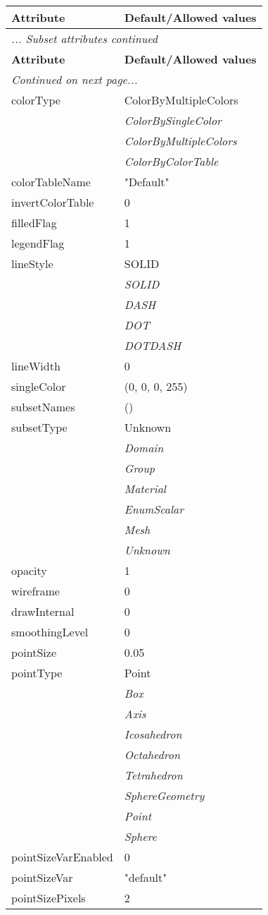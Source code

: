 \documentclass[10pt,a4paper]{report}
\begin{document}
\begin{longtable}{ll}
{\bf Attribute} & {\bf Default/Allowed values} \\
\hline \hline
\endfirsthead
\multicolumn{2}{l}{{\it ... Subset attributes continued}} \\
{\bf Attribute} & {\bf Default/Allowed values} \\
\hline \hline
\endhead
\hline
\multicolumn{2}{l}{{\it Continued on next page...}} \\
\endfoot
\hline
\endlastfoot

colorType  &  ColorByMultipleColors   \\
 & {\it  ColorBySingleColor} \\
 & {\it  ColorByMultipleColors} \\
 & {\it  ColorByColorTable} \\
colorTableName  &  "Default" \\
invertColorTable  &  0 \\
filledFlag  &  1 \\
legendFlag  &  1 \\
lineStyle  &  SOLID   \\
 & {\it  SOLID} \\
 & {\it  DASH} \\
 & {\it  DOT} \\
 & {\it  DOTDASH} \\
lineWidth  &  0 \\
singleColor  &  (0, 0, 0, 255) \\
subsetNames  &  () \\
subsetType  &  Unknown   \\
 & {\it  Domain} \\
 & {\it  Group} \\
 & {\it  Material} \\
 & {\it  EnumScalar} \\
 & {\it  Mesh} \\
 & {\it  Unknown} \\
opacity  &  1 \\
wireframe  &  0 \\
drawInternal  &  0 \\
smoothingLevel  &  0 \\
pointSize  &  0.05 \\
pointType  &  Point   \\
 & {\it  Box} \\
 & {\it  Axis} \\
 & {\it  Icosahedron} \\
 & {\it  Octahedron} \\
 & {\it  Tetrahedron} \\
 & {\it  SphereGeometry} \\
 & {\it  Point} \\
 & {\it  Sphere} \\
pointSizeVarEnabled  &  0 \\
pointSizeVar  &  "default" \\
pointSizePixels  &  2 \\
\end{longtable}
\end{document}
